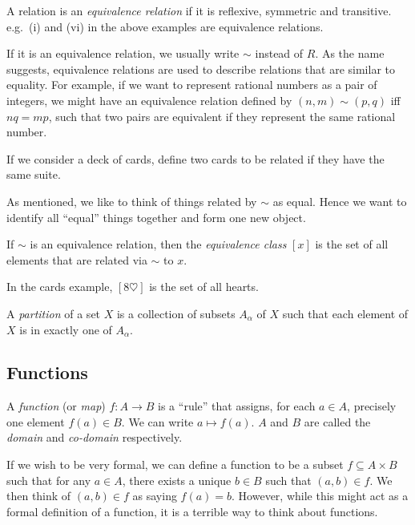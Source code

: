 \begin{defi}
  A relation is an \emph{equivalence relation} if it is reflexive, symmetric and transitive. e.g.\ (i) and (vi) in the above examples are equivalence relations.
\end{defi}
If it is an equivalence relation, we usually write $\sim$ instead of $R$. As the name suggests, equivalence relations are used to describe relations that are similar to equality. For example, if we want to represent rational numbers as a pair of integers, we might have an equivalence relation defined by $(n, m)\sim (p, q)$ iff $nq = mp$, such that two pairs are equivalent if they represent the same rational number.

\begin{eg}
  If we consider a deck of cards, define two cards to be related if they have the same suite.
\end{eg}

As mentioned, we like to think of things related by $\sim$ as equal. Hence we want to identify all ``equal'' things together and form one new object.
\begin{defi}
  If $\sim$ is an equivalence relation, then the \emph{equivalence class} $[x]$ is the set of all elements that are related via $\sim$ to $x$.
\end{defi}

\begin{eg}
  In the cards example, $[8\heartsuit]$ is the set of all hearts.
\end{eg}

\begin{defi}
  A \emph{partition} of a set $X$ is a collection of subsets $A_\alpha$ of $X$ such that each element of $X$ is in exactly one of $A_\alpha$.
\end{defi}

\subsection{Functions}
\begin{defi}
    A \emph{function} (or \emph{map}) $f: A\to B$ is a ``rule'' that assigns, for each $a\in A$, precisely one element $f(a)\in B$. We can write $a\mapsto f(a)$. $A$ and $B$ are called the \emph{domain} and \emph{co-domain} respectively.
  \end{defi}
  If we wish to be very formal, we can define a function to be a subset $f\subseteq A\times B$ such that for any $a\in A$, there exists a unique $b\in B$ such that $(a, b)\in f$. We then think of $(a, b) \in f$ as saying $f(a) = b$. However, while this might act as a formal definition of a function, it is a terrible way to think about functions.
  
